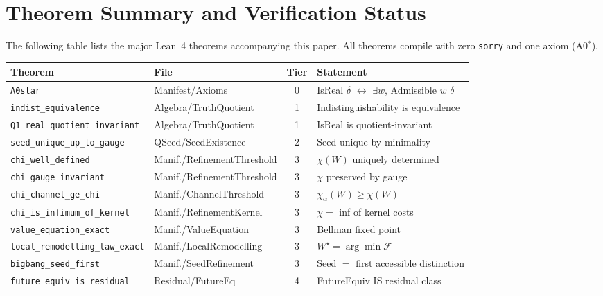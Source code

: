 
\section{Theorem Summary and Verification Status}
\label{app:theorem-table}

The following table lists the major Lean~4 theorems accompanying this paper.
All theorems compile with zero \texttt{sorry} and one axiom (A0$^*$).

\begin{center}
\small
\begin{tabular}{@{}llcp{4.5cm}@{}}
\hline
\textbf{Theorem} & \textbf{File} & \textbf{Tier} & \textbf{Statement} \\
\hline
\texttt{A0star} & Manifest/Axioms & 0 & IsReal $\delta$ $\leftrightarrow$ $\exists w$, Admissible $w$ $\delta$ \\
\texttt{indist\_equivalence} & Algebra/TruthQuotient & 1 & Indistinguishability is equivalence \\
\texttt{Q1\_real\_quotient\_invariant} & Algebra/TruthQuotient & 1 & IsReal is quotient-invariant \\
\texttt{seed\_unique\_up\_to\_gauge} & QSeed/SeedExistence & 2 & Seed unique by minimality \\
\texttt{chi\_well\_defined} & Manif./RefinementThreshold & 3 & $\chi(W)$ uniquely determined \\
\texttt{chi\_gauge\_invariant} & Manif./RefinementThreshold & 3 & $\chi$ preserved by gauge \\
\texttt{chi\_channel\_ge\_chi} & Manif./ChannelThreshold & 3 & $\chi_\alpha(W) \geq \chi(W)$ \\
\texttt{chi\_is\_infimum\_of\_kernel} & Manif./RefinementKernel & 3 & $\chi =$ inf of kernel costs \\
\texttt{value\_equation\_exact} & Manif./ValueEquation & 3 & Bellman fixed point \\
\texttt{local\_remodelling\_law\_exact} & Manif./LocalRemodelling & 3 & $W^\star = \arg\min \mathcal{F}$ \\
\texttt{bigbang\_seed\_first} & Manif./SeedRefinement & 3 & Seed $=$ first accessible distinction \\
\texttt{future\_equiv\_is\_residual} & Residual/FutureEq & 4 & FutureEquiv IS residual class \\

\end{tabular}
\end{center}

